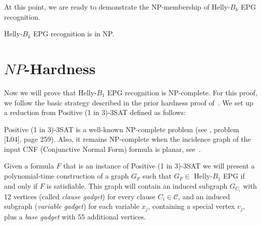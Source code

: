 At this point, we are ready to demonstrate the NP-membership of {\sc Helly-$B_k$ EPG recognition}.

\medskip

\begin{theorem}\label{teo:nppertinencia}
{\sc Helly-$B_k$ EPG recognition} is in NP.
\end{theorem}


\section{$NP$-Hardness}\label{sec:sectionDispositivoClausula}

Now we will prove that  {\sc Helly-$B_1$ EPG recognition} is NP-complete. For this proof, we follow the basic strategy described in the prior hardness proof of~\cite{heldt2014}. We set up a reduction from {\sc Positive (1 in 3)-3SAT} defined  as follows:



{\sc Positive (1 in 3)-3SAT } is a well-known NP-complete problem (see \cite{johnson1979}, problem [L04], page 259). Also, it remains NP-complete when the incidence graph of the input CNF (Conjunctive Normal Form) formula is planar, see~\cite{mulzer2008minimum}.

Given a formula $F$ that is an instance of {\sc Positive (1 in 3)-3SAT} we will present a polynomial-time construction of a graph $ G_F$ such that $ G_F \in$ Helly-$B_1$ EPG if and only if $ F $ is satisfiable. This graph will contain an induced subgraph $ G_{C_i}$ with 12 vertices (called \emph {clause gadget}) for every clause $C_i \in \mathcal{C}$, and an induced subgraph (\emph {variable gadget}) for each variable $ x_j$, containing a special vertex  $ v_j$, plus a \emph{base gadget}  with 55 additional vertices.

